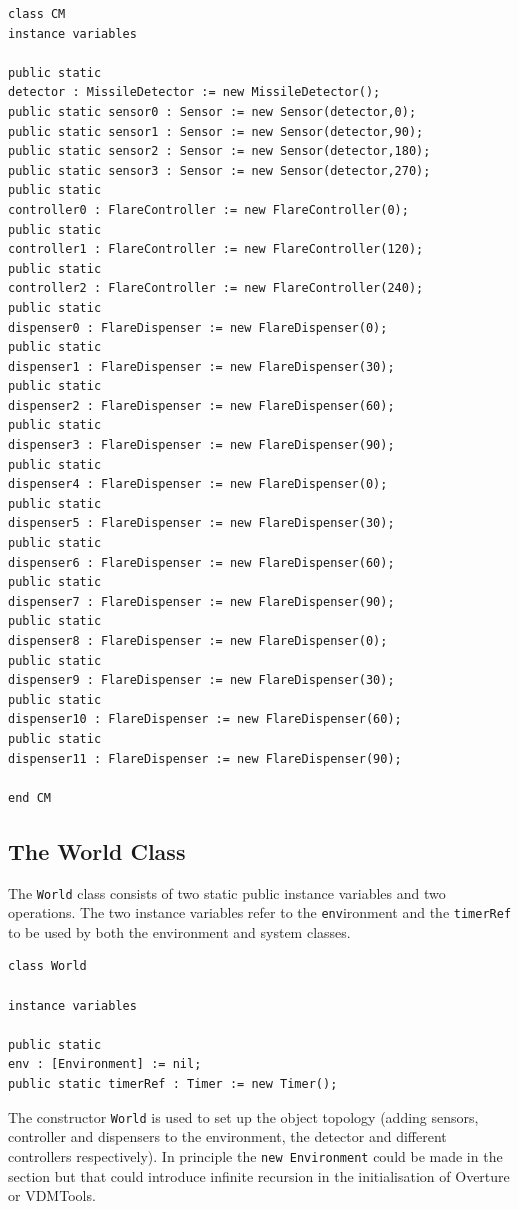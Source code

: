 \documentclass{overturerepchap}
\newcommand{\vdmtools}{VDMTools}
\begin{document}
\begin{lstlisting}
class CM
instance variables

public static 
detector : MissileDetector := new MissileDetector();
public static sensor0 : Sensor := new Sensor(detector,0);
public static sensor1 : Sensor := new Sensor(detector,90);
public static sensor2 : Sensor := new Sensor(detector,180);
public static sensor3 : Sensor := new Sensor(detector,270);
public static 
controller0 : FlareController := new FlareController(0);
public static 
controller1 : FlareController := new FlareController(120);
public static 
controller2 : FlareController := new FlareController(240);
public static 
dispenser0 : FlareDispenser := new FlareDispenser(0);
public static 
dispenser1 : FlareDispenser := new FlareDispenser(30);
public static 
dispenser2 : FlareDispenser := new FlareDispenser(60);
public static 
dispenser3 : FlareDispenser := new FlareDispenser(90);
public static 
dispenser4 : FlareDispenser := new FlareDispenser(0);
public static 
dispenser5 : FlareDispenser := new FlareDispenser(30);
public static 
dispenser6 : FlareDispenser := new FlareDispenser(60);
public static 
dispenser7 : FlareDispenser := new FlareDispenser(90);
public static 
dispenser8 : FlareDispenser := new FlareDispenser(0);
public static 
dispenser9 : FlareDispenser := new FlareDispenser(30);
public static 
dispenser10 : FlareDispenser := new FlareDispenser(60);
public static 
dispenser11 : FlareDispenser := new FlareDispenser(90);

end CM
\end{lstlisting}

\subsection{The World Class}

The \texttt{World} class consists of two static public instance variables and
two operations. The two instance variables refer to the \texttt{env}ironment
and the \texttt{timerRef} to be used by both the environment and system
classes. 

\begin{lstlisting}
class World

instance variables
  
public static 
env : [Environment] := nil;
public static timerRef : Timer := new Timer();
\end{lstlisting}

The constructor \texttt{World} is used to set
up the object topology (adding sensors, controller and dispensers to 
the environment, the detector and different controllers respectively).
In principle the \texttt{new Environment} could be made in the 
{\bf{}} section but that could introduce infinite 
recursion in the initialisation of Overture or \vdmtools.
\end{document}
